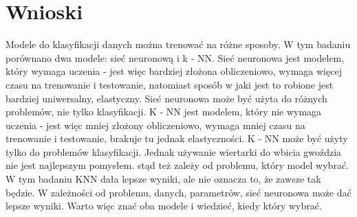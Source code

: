 \section{Wnioski}\label{sec:wnioski}
Modele do klasyfikacji danych można trenować na różne sposoby. W tym badaniu porównano dwa modele: sieć neuronową i k - NN.
Sieć neuronowa jest modelem, który wymaga uczenia - jest więc bardziej złożona obliczeniowo, wymaga więcej czasu na trenowanie i testowanie,
natomiast sposób w jaki jest to robione jest bardziej uniwersalny, elastyczny. Sieć neuronowa może być użyta do różnych problemów, nie tylko klasyfikacji.
K - NN jest modelem, który nie wymaga uczenia - jest więc mniej złożony obliczeniowo, wymaga mniej czasu na trenowanie i testowanie,
brakuje tu jednak elastyczności. K - NN może być użyty tylko do problemów klasyfikacji. Jednak używanie wiertarki do wbicia gwoździa nie jest najlepszym pomysłem.
stąd też zależy od problemu, który model wybrać. W tym badaniu KNN dała lepsze wyniki, ale nie oznacza to, że zawsze tak będzie. W zależności od problemu,
danych, parametrów, sieć neuronowa może dać lepsze wyniki. Warto więc znać oba modele i wiedzieć, kiedy który wybrać.